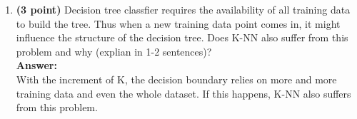 \begin{enumerate}
	\item \textbf{(3 point)}
	Decision tree classfier requires the availability of all training data to build the tree. Thus when a new training data point comes in, it might influence the structure of the decision tree. Does K-NN also suffer from this problem and why (explian in 1-2 sentences)? 
	\\\textbf{Answer:}\\
	With the increment of K, the decision boundary relies on more and more training data and even the whole dataset. If this happens, K-NN also suffers from this problem.
	
\end{enumerate}
\newpage
